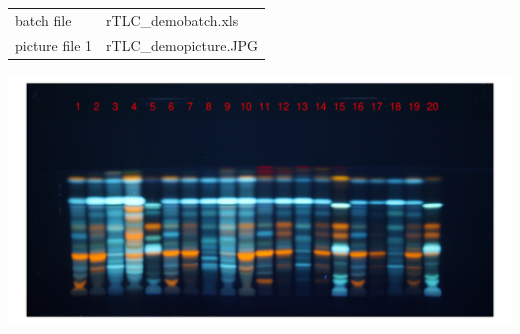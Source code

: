 \documentclass[a4paper]{article}\usepackage[]{graphicx}\usepackage[]{color}
\makeatletter
\def\maxwidth{ %
  \ifdim\Gin@nat@width>\linewidth
    \linewidth
  \else
    \Gin@nat@width
  \fi
}
\makeatother
\begin{document}






\begin{table}[ht]
\centering
\begin{tabular}{ll}
  \hline
  \hline
batch file & rTLC\_demobatch.xls \\ 
  picture file 1 & rTLC\_demopicture.JPG \\ 
   \hline
\end{tabular}
\end{table}

\includegraphics[width=\maxwidth]{figure/unnamed-chunk-1-1} 
\end{document}
